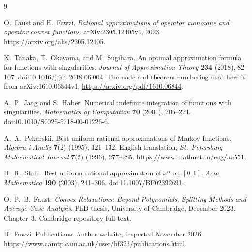 \documentclass[11pt]{article}
\numberwithin{equation}{section}
\begin{document}
\begin{thebibliography}{9}\raggedright
{}
O.~Faust and H.~Fawzi.
\emph{Rational approximations of operator monotone and operator convex functions}.
arXiv:2305.12405v1, 2023.
\url{https://arxiv.org/abs/2305.12405}.

K.~Tanaka, T.~Okayama, and M.~Sugihara.
An optimal approximation formula for functions with singularities.
\emph{Journal of Approximation Theory} \textbf{234} (2018), 82--107.
\href{https://doi.org/10.1016/j.jat.2018.06.004}{doi:10.1016/j.jat.2018.06.004}.
The node and theorem numbering used here is from arXiv:1610.06844v1,
\url{https://arxiv.org/pdf/1610.06844}.

A.~P.~Jang and S.~Haber.
Numerical indefinite integration of functions with singularities.
\emph{Mathematics of Computation} \textbf{70} (2001), 205--221.
\href{https://doi.org/10.1090/S0025-5718-00-01226-6}{doi:10.1090/S0025-5718-00-01226-6}.

A.~A.~Pekarskii.
Best uniform rational approximations of Markov functions.
\emph{Algebra i Analiz} \textbf{7}(2) (1995), 121--132;
English translation, \emph{St.~Petersburg Mathematical Journal}
\textbf{7}(2) (1996), 277--285.
\url{https://www.mathnet.ru/eng/aa551}.

H.~R.~Stahl.
Best uniform rational approximation of $x^\alpha$ on $[0,1]$.
\emph{Acta Mathematica} \textbf{190} (2003), 241--306.
\href{https://doi.org/10.1007/BF02392691}{doi:10.1007/BF02392691}.

O.~P.~B.~Faust.
\emph{Convex Relaxations: Beyond Polynomials, Splitting Methods and Average Case Analysis}.
PhD thesis, University of Cambridge, December 2023, Chapter~3.
\href{https://api.repository.cam.ac.uk/server/api/core/bitstreams/95b542c8-984c-45ca-bfee-e90bcad55a73/content}{Cambridge repository full text}.

H.~Fawzi. Publications. Author website, inspected November 2026.
\url{https://www.damtp.cam.ac.uk/user/hf323/publications.html}.
\end{thebibliography}
\end{document}
